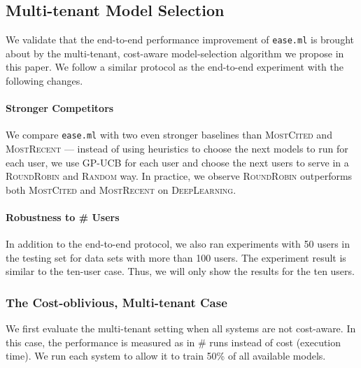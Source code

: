 \documentclass[letterpaper]{vldb}
\newcommand{\eml}{\texttt{ease.ml}\xspace}
\begin{document}
\subsection{Multi-tenant Model Selection}

We validate that the end-to-end performance
improvement of \eml is brought about by the
multi-tenant, cost-aware model-selection
algorithm we propose in this paper.
We follow a similar protocol as the
end-to-end experiment with the following changes.

\vspace{-0.5em}
\paragraph*{Stronger Competitors} We compare
\eml with two even stronger baselines
than \textsc{MostCited} and \textsc{MostRecent} ---
instead of using heuristics to choose the
next models to run for each user, we
use GP-UCB for each user and
choose the next users to serve 
in a \textsc{RoundRobin} 
and \textsc{Random} way. In practice,
we observe \textsc{RoundRobin} outperforms both 
\textsc{MostCited} and \textsc{MostRecent}
on \textsc{DeepLearning}.

\vspace{-0.5em}
\paragraph*{Robustness to \# Users}

In addition to the end-to-end
protocol, we also ran
experiments with 50 users
in the testing set for data sets
with more than 100 users. The experiment
result is similar to the ten-user case.
Thus, we will only show the
results for the ten users.

\vspace{-0.5em}
\subsubsection{The Cost-oblivious, Multi-tenant Case}

We first evaluate the multi-tenant setting
when all systems are not cost-aware. In this
case, the performance is measured as in
\# runs instead of cost (execution time).
We run each system to allow it to
train 50\% of all available models.

\vspace{-1em}
\end{document}
